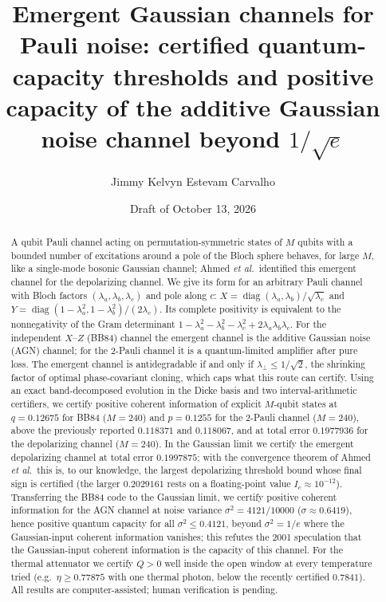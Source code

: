 \documentclass[aps,pra,reprint,superscriptaddress,nofootinbib,longbibliography,floatfix]{revtex4-2}
\theoremstyle{remark}
\newcommand{\diag}{\operatorname{diag}}
\newcommand{\Ic}{I_c}
\newcommand{\lperp}{\lambda_\perp}
\begin{document}
\title{Emergent Gaussian channels for Pauli noise: certified quantum-capacity thresholds and
positive capacity of the additive Gaussian noise channel beyond $1/\sqrt{e}$}

\author{Jimmy Kelvyn Estevam Carvalho}

\date{Draft of October 13, 2026}

\begin{abstract}
A qubit Pauli channel acting on permutation-symmetric states of $M$ qubits with a bounded number of
excitations around a pole of the Bloch sphere behaves, for large $M$, like a single-mode bosonic
Gaussian channel; Ahmed \textit{et al.}\ identified this emergent channel for the depolarizing
channel. We give its form for an arbitrary Pauli channel with Bloch factors
$(\lambda_a,\lambda_b,\lambda_c)$ and pole along $c$: $X=\diag(\lambda_a,\lambda_b)/\sqrt{\lambda_c}$ and
$Y=\diag(1-\lambda_a^2,1-\lambda_b^2)/(2\lambda_c)$. Its complete positivity is equivalent to the
nonnegativity of the Gram determinant $1-\lambda_a^2-\lambda_b^2-\lambda_c^2+2\lambda_a\lambda_b\lambda_c$.
For the independent $X$--$Z$ (BB84) channel the emergent channel is the additive Gaussian noise (AGN)
channel; for the 2-Pauli channel it is a quantum-limited amplifier after pure loss. The emergent
channel is antidegradable if and only if $\lperp\le 1/\sqrt2$, the shrinking factor of optimal
phase-covariant cloning, which caps what this route can certify. Using an exact band-decomposed
evolution in the Dicke basis and two interval-arithmetic certifiers, we certify positive coherent
information of explicit $M$-qubit states at $q=0.12675$ for BB84 ($M=240$) and $p=0.1255$ for the
2-Pauli channel ($M=240$), above the previously reported $0.118371$ and $0.118067$, and at total error
$0.1977936$ for the depolarizing channel ($M=240$). In the Gaussian limit we certify the emergent
depolarizing channel at total error $0.1997875$; with the convergence theorem of Ahmed \textit{et al.}\
this is, to our knowledge, the largest depolarizing threshold bound whose final sign is certified (the
larger $0.2029161$ rests on a floating-point value $\Ic\approx10^{-12}$).
Transferring the BB84 code to the Gaussian limit, we certify
positive coherent information for the AGN channel at noise variance $\sigma^2=4121/10000$
($\sigma\approx0.6419$), hence positive quantum capacity for all $\sigma^2\le0.4121$, beyond
$\sigma^2=1/e$ where the Gaussian-input coherent information vanishes; this refutes the 2001
speculation that the Gaussian-input coherent information is the capacity of this channel. For the thermal attenuator we certify $Q>0$ well inside the open window at every temperature tried
(e.g.\ $\eta\ge0.77875$ with one thermal photon, below the recently certified $0.7841$).
All results are computer-assisted; human verification is pending.
\end{abstract}
\end{document}
